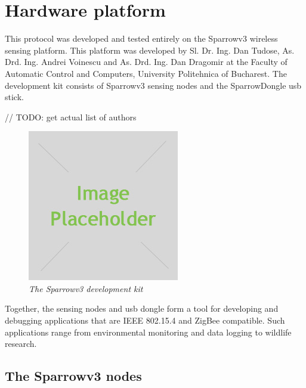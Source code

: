 
\chapter{Hardware platform}

This protocol was developed and tested entirely on the Sparrowv3 wireless
sensing platform. This platform was developed by Sl. Dr. Ing. Dan Tudose, As.
Drd. Ing. Andrei Voinescu and As. Drd. Ing. Dan Dragomir at the Faculty of
Automatic Control and Computers, University Politehnica of Bucharest. The
development kit consists of Sparrowv3 sensing nodes and the SparrowDongle usb stick.

\color{red} 
// TODO: get actual list of authors
\color{black}

\begin{figure}[ht]
	\begin{center}
		\includegraphics{img/placeholder.jpg}
	\end{center}
	\caption{\small \itshape{The Sparrowv3 development kit}}
\end{figure}

Together, the sensing nodes and usb dongle form a tool for developing and
debugging applications that are IEEE 802.15.4 and ZigBee compatible. Such
applications range from environmental monitoring and data logging to wildlife
research.

\section{The Sparrowv3 nodes}

